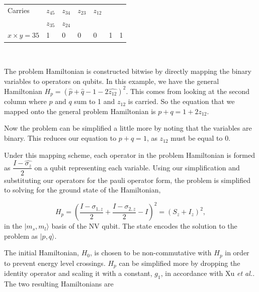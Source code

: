 \documentclass[%
 reprint,
 amsmath,amssymb,
 aps,
]{revtex4-1}
\begin{document}
\begin{flushleft}
\begin{tabular}{ p{1.7cm}  p{1cm} p{1cm} p{1cm} p{1cm} p{1cm} p{1cm}}
Carries &$z_{45}$ &$z_{34}$ &$z_{23}$ &$z_{12}$ &\hspace{0.1cm} &\hspace{0.1cm} \\ 

\hspace{0.1cm} &$z_{35}$ &$z_{24}$ &\hspace{0.1cm}  &\hspace{0.1cm} &\hspace{0.1cm} &\hspace{0.1cm} \\ 

$x \times y = 35$ &1 &0 &0 &0 &1 &1 \\ 
\hline
\end{tabular}
\\
\end{flushleft}

	The problem Hamiltonian is constructed bitwise by directly mapping the binary variables to operators on qubits\cite{Xu2012}. In this example, we have the general Hamiltonian 
	$H_p = \left( \hat{p} + \hat{q} -1 -2\hat{z_{12}} \right)^2 $.
This comes from looking at the second column where $p$ and $q$ sum to 1 and $z_{12}$ is carried. So the equation that we mapped onto the general problem Hamiltonian is $p+q=1+2z_{12}$.

	
	 Now the problem can be simplified a little more by noting that the variables are binary. This reduces our equation to $p+q=1$, as $z_{12}$ must be equal to 0.	 
	 
	  Under this mapping scheme, each operator in the problem Hamiltonian is formed as $\dfrac{I-\hat{\sigma_z}}{2}$ on a qubit representing each variable. Using our simplification and substituting our operators for the pauli operator form, the problem is simplified to solving for the ground state of the Hamiltonian,
	
\begin{equation}
	H_p = \left( \dfrac{I-\sigma_{1,z}}{2} + \dfrac{I-\sigma_{2,z}}{2} - I\right)^2 = \left(S_z + I_z \right)^2 ,
\end{equation}
in the $\vert m_s,m_l \rangle$ basis of the NV qubit. The state encodes the solution to the problem as   $\vert p,q \rangle$.

	The initial Hamiltonian, $H_0$, is chosen to be non-commutative with $H_p$ in order to prevent energy level crossings. $H_p$ can be simplified more by dropping the identity operator and scaling it with a constant, $g_1$, in accordance with Xu \textit{et al.}. The two resulting Hamiltonians are
\end{document}
